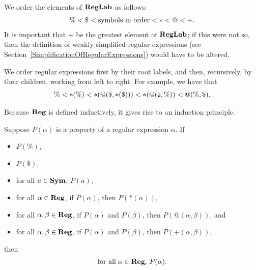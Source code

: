 We order the elements of $\mathbf{RegLab}$ as follows:
\begin{gather*}
\% < \$ < \allowbreak\mbox{symbols in order}\allowbreak < {*} < @ < {+} .
\end{gather*}
%
It is important that ${+}$ be the greatest element of $\mathbf{RegLab}$;
if this were not so, then the definition of weakly simplified regular
expressions (see Section~\ref{SimplificationOfRegularExpressions})
would have to be altered.

We order regular expressions first by their root labels, and then,
recursively, by their children, working from left to right.
For example, we have that
\begin{gather*}
\% < {*}(\%)
   < {*}(@(\$,{*}(\$)))
   < {*}(@(\mathsf{a},\%))
   < @(\%,\$) .
\end{gather*}

Because $\mathbf{Reg}$ is defined inductively, it gives rise to an induction
principle.

\begin{theorem}
Suppose $P(\alpha)$ is a property of a regular expression $\alpha$.
If
\begin{itemize}
\item $P(\%)$,

\item $P(\$)$,

\item for all $a\in\mathbf{Sym}$, $P(a)$,

\item for all $\alpha\in\mathbf{Reg}$, if $P(\alpha)$, then
$P({*}(\alpha))$,

\item for all $\alpha,\beta\in\mathbf{Reg}$, if $P(\alpha)$ and
$P(\beta)$, then $P(@(\alpha,\beta))$, and

\item for all $\alpha,\beta\in\mathbf{Reg}$, if $P(\alpha)$ and
$P(\beta)$, then $P({+}(\alpha,\beta))$,
\end{itemize}
then
\begin{gather*}
\allowbreak\mbox{for all}\allowbreak\;\alpha\in\mathbf{Reg},\,P(\alpha) .
\end{gather*}
\end{theorem}

